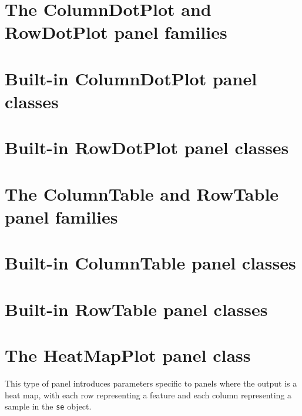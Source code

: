 \documentclass[]{book}
\begin{document}
\hypertarget{the-columndotplot-and-rowdotplot-panel-families}{%
\section{The ColumnDotPlot and RowDotPlot panel families}\label{the-columndotplot-and-rowdotplot-panel-families}}

\hypertarget{built-in-columndotplot-panel-classes}{%
\section{Built-in ColumnDotPlot panel classes}\label{built-in-columndotplot-panel-classes}}

\hypertarget{built-in-rowdotplot-panel-classes}{%
\section{Built-in RowDotPlot panel classes}\label{built-in-rowdotplot-panel-classes}}

\hypertarget{the-columntable-and-rowtable-panel-families}{%
\section{The ColumnTable and RowTable panel families}\label{the-columntable-and-rowtable-panel-families}}

\hypertarget{built-in-columntable-panel-classes}{%
\section{Built-in ColumnTable panel classes}\label{built-in-columntable-panel-classes}}

\hypertarget{built-in-rowtable-panel-classes}{%
\section{Built-in RowTable panel classes}\label{built-in-rowtable-panel-classes}}

\hypertarget{heatmapplot-class}{%
\section{The HeatMapPlot panel class}\label{heatmapplot-class}}

This type of panel introduces parameters specific to panels where the output is a heat map, with each row representing a feature and each column representing a sample in the \texttt{se} object.
\end{document}
